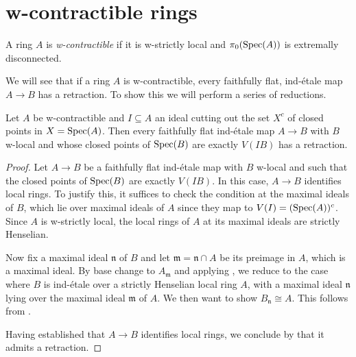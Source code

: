 \section{w-contractible rings}

\begin{definition}
    A ring \(A\) is \emph{w-contractible} if it is w-strictly local and $\pi_0(\mathrm{Spec}(A))$
    is extremally disconnected.
    \label{def:w-contractible-ring}
    \leanok
\end{definition}

We will see that if a ring $A$ is w-contractible, every faithfully flat, ind-étale map $A \to B$ has a retraction. To show
this we will perform a series of reductions.

\begin{lemma}
    \label{thm:ind-etale-plus-c-has-retraction-if-w-contractible}
    \leanok
    Let $A$ be w-contractible and $I \subseteq A$ an ideal cutting out the set $X^c$ of closed points in $X = \mathrm{Spec}(A)$.
    Then every faithfully flat ind-étale map \(A \to B\) with \(B\) w-local and
    whose closed points of \(\operatorname{Spec} (B)\) are exactly \(V(IB)\) has a retraction.
\end{lemma}

\begin{proof}
  Let \(A \to B\) be a faithfully flat ind-étale map with \(B\) w-local and such that the closed points of \(\operatorname{Spec}(B)\) are exactly \(V(IB)\). In this case, \(A \to B\) identifies local rings. To justify this, it suffices to check the condition at the maximal ideals of \(B\), which lie over maximal ideals of \(A\) since they map to \(V(I) = (\operatorname{Spec}(A))^c\). Since \(A\) is w-strictly local, the local rings of \(A\) at its maximal ideals are strictly Henselian.

  Now fix a maximal ideal \(\mathfrak{n}\) of \(B\) and let \(\mathfrak{m} = \mathfrak{n} \cap A\) be its preimage in \(A\), which is a maximal ideal. By base change to \(A_{\mathfrak{m}}\) and applying , we reduce to the case where \(B\) is ind-étale over a strictly Henselian local ring \(A\), with a maximal ideal \(\mathfrak{n}\) lying over the maximal ideal \(\mathfrak{m}\) of \(A\). We then want to show \(B_{\mathfrak{n}} \cong A\). This follows from .

  Having established that \(A \to B\) identifies local rings, we conclude by  that it admits a retraction.
\end{proof}

